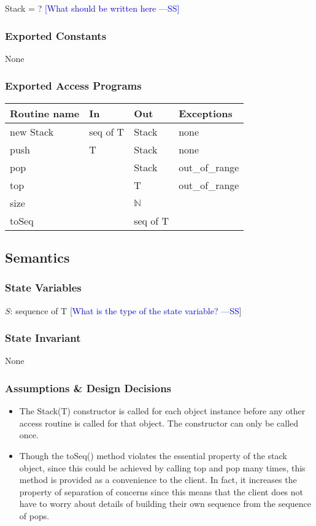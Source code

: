 \documentclass[12pt]{article}
\newcommand{\authornote}[3]{\textcolor{#1}{[#3 ---#2]}}
\newcommand{\authornote}[3]{}
\newcommand{\wss}[1]{\authornote{blue}{SS}{#1}}
\begin{document}
Stack = ? \wss{What should be written here}

\subsubsection* {Exported Constants}

None

\subsubsection* {Exported Access Programs}

\begin{tabular}{| l | l | l | p{5cm} |}
\hline
\textbf{Routine name} & \textbf{In} & \textbf{Out} & \textbf{Exceptions}\\
\hline
new Stack & seq of T & Stack & none\\
\hline
push & T & Stack & none\\
\hline
pop & & Stack & out\_of\_range\\
\hline
top & & T & out\_of\_range\\
\hline
size & & $\mathbb{N}$ & \\
\hline
toSeq& & seq of T & \\
\hline
\end{tabular}

\subsection* {Semantics}

\subsubsection* {State Variables}

$S$: sequence of T \wss{What is the type of the state variable?}

\subsubsection* {State Invariant}

None

\subsubsection* {Assumptions \& Design Decisions}

\begin{itemize}
\item The Stack(T) constructor is called for each object instance before any
  other access routine is called for that object.  The constructor can only be
  called once.
\item Though the toSeq() method violates the essential property of the stack
  object, since this could be achieved by calling top and pop many times, this
  method is provided as a convenience to the client. In fact, it increases the
  property of separation of concerns since this means that the client does not
  have to worry about details of building their own sequence from the sequence
  of pops.
\end{itemize}
\end{document}
